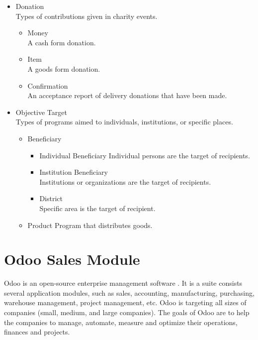 \begin{itemize}
	\item Donation \\
	Types of contributions given in charity events.
	\begin{itemize}
		\item Money \\
		A cash form donation.
		\item Item \\
		A goods form donation.
		\item Confirmation \\
		An acceptance report of delivery donations that have been made.
	\end{itemize}
	
	\item Objective Target \\
	Types of programs aimed to individuals, institutions, or specific places.
	\begin{itemize}
		\item Beneficiary
		\begin{itemize}
			\item Individual Beneficiary
			Individual persons are the target of recipients.
			\item Institution Beneficiary \\
			Institutions or organizations are the target of recipients.
			\item District \\
			Specific area is the target of recipient.
		\end{itemize}
		\item Product
		Program that distributes goods.
	\end{itemize}
\end{itemize}


\section{Odoo Sales Module}
Odoo is an open-source \citep{web.Odoo.whatIsOdoo,web.Odoo.ERPComparison} enterprise management software \citep{web.Odoo.whatIsOdoo}. It is a suite consists several application modules, such as sales, accounting, manufacturing, purchasing, warehouse management, project management, etc. Odoo is targeting all sizes of companies (small, medium, and large companies). The goals of Odoo are to help the companies to manage, automate, measure and optimize their operations, finances and projects.

